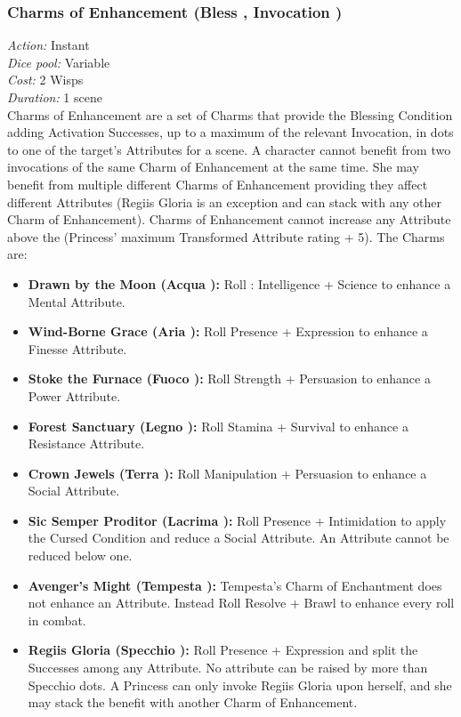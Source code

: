 \subsubsection*{Charms of Enhancement (Bless \textbullet\textbullet\textbullet, Invocation \textbullet\textbullet)}

\emph{Action:} Instant \\ 

\emph{Dice pool:} Variable \\

\emph{Cost:} 2 Wisps\\

\emph{Duration:} 1 scene\\

\noindent Charms of Enhancement are a set of Charms that provide the Blessing Condition adding Activation Successes, up to a maximum of the relevant Invocation, in dots to one of the target's Attributes for a scene. A character cannot benefit from two invocations of the same Charm of Enhancement at the same time. She may benefit from multiple different Charms of Enhancement providing they affect different Attributes (Regiis Gloria is an exception and can stack with any other Charm of Enhancement). Charms of Enhancement cannot increase any Attribute above the (Princess' maximum Transformed Attribute rating + 5). The Charms are: 

\begin{itemize}
\item \textbf{Drawn by the Moon (Acqua \textbullet\textbullet):} Roll : Intelligence + Science to enhance a Mental Attribute.
\item \textbf{Wind-Borne Grace (Aria \textbullet\textbullet):} Roll Presence + Expression to enhance a Finesse Attribute. 
\item \textbf{Stoke the Furnace (Fuoco \textbullet\textbullet):} Roll Strength + Persuasion to enhance a Power Attribute.
\item \textbf{Forest Sanctuary (Legno \textbullet\textbullet):} Roll Stamina + Survival to enhance a Resistance Attribute.
\item \textbf{Crown Jewels (Terra \textbullet\textbullet):} Roll Manipulation + Persuasion to enhance a Social Attribute.
\item \textbf{Sic Semper Proditor (Lacrima \textbullet\textbullet):} Roll Presence + Intimidation to apply the Cursed Condition and reduce a Social Attribute. An Attribute cannot be reduced below one.
\item \textbf{Avenger’s Might (Tempesta \textbullet\textbullet):} Tempesta's Charm of Enchantment does not enhance an Attribute. Instead Roll  Resolve + Brawl to enhance every roll in combat. 
\item \textbf{Regiis Gloria (Specchio \textbullet\textbullet\textbullet):} Roll Presence + Expression and split the Successes among any Attribute. No attribute can be raised by more than Specchio dots. A Princess can only invoke Regiis Gloria upon herself, and she may stack the benefit with another Charm of Enhancement.  
\end{itemize}


